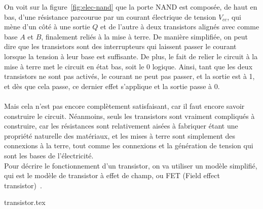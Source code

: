 On voit sur la figure~\ref{fig:elec-nand} que la porte NAND est composée, de haut en bas, d'une résistance parcourue
par un courant électrique de tension $V_{cc}$, qui mène d'un côté à une sortie $Q$ et de l'autre à deux transistors
alignés avec comme base $A$ et $B$, finalement reliés à la mise à terre.
De manière simplifiée, on peut dire que les transistors sont des interrupteurs qui laissent passer le courant
lorsque la tension à leur base est suffisante.
De plus, le fait de relier le circuit à la mise à terre met le circuit en état bas, soit le 0 logique.
Ainsi, tant que les deux transistors ne sont pas activés, le courant ne peut pas passer, et la sortie est à 1,
et dès que cela passe, ce dernier effet s'applique et la sortie passe à 0.\\ \\
Mais cela n'est pas encore complètement satisfaisant, car il faut encore savoir construire le circuit.
Néanmoins, seuls les transistors sont vraiment compliqués à construire, car les résistances sont relativement
aisées à fabriquer étant une propriété naturelle des matériaux, et les mises à terre sont simplement des
connexions à la terre, tout comme les connexions et la génération de tension qui sont les bases de l'électricité.\\
Pour décrire le fonctionnement d'un transistor, on va utiliser un modèle simplifié, qui est le modèle de
transistor à effet de champ, ou FET (Field effect transistor)~\cite{wiki:mosfet}.

{transistor.tex}

